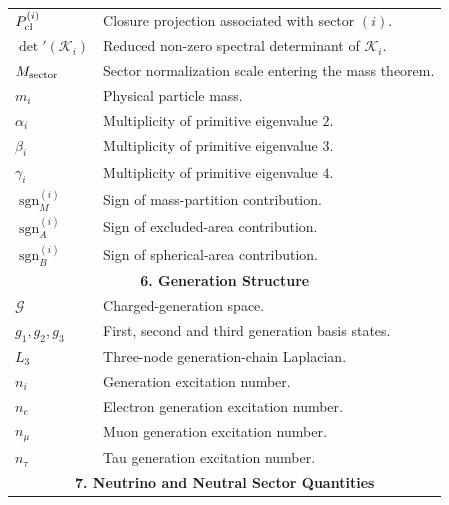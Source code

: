 \documentclass[11pt]{article}
\theoremstyle{definition}
\theoremstyle{remark}
\begin{document}
\begin{longtable}{p{}p{}}
$P_{\rm cl}^{(i)}$ & Closure projection associated with sector $(i)$. \\

$\det{}'(\mathcal K_i)$ & Reduced non-zero spectral determinant of $\mathcal K_i$. \\

$M_{\rm sector}$ & Sector normalization scale entering the mass theorem. \\

$m_i$ & Physical particle mass. \\

$\alpha_i$ & Multiplicity of primitive eigenvalue $2$. \\

$\beta_i$ & Multiplicity of primitive eigenvalue $3$. \\

$\gamma_i$ & Multiplicity of primitive eigenvalue $4$. \\

$\operatorname{sgn}_M^{(i)}$ & Sign of mass-partition contribution. \\

$\operatorname{sgn}_A^{(i)}$ & Sign of excluded-area contribution. \\

$\operatorname{sgn}_B^{(i)}$ & Sign of spherical-area contribution. \\

\hline
\multicolumn{2}{c}{\textbf{6. Generation Structure}} \\
\hline

$\mathcal G$ & Charged-generation space. \\

$g_1,g_2,g_3$ & First, second and third generation basis states. \\

$L_3$ & Three-node generation-chain Laplacian. \\

$n_i$ & Generation excitation number. \\

$n_e$ & Electron generation excitation number. \\

$n_\mu$ & Muon generation excitation number. \\

$n_\tau$ & Tau generation excitation number. \\

\hline
\multicolumn{2}{c}{\textbf{7. Neutrino and Neutral Sector Quantities}} \\
\hline


\end{longtable}
\end{document}
